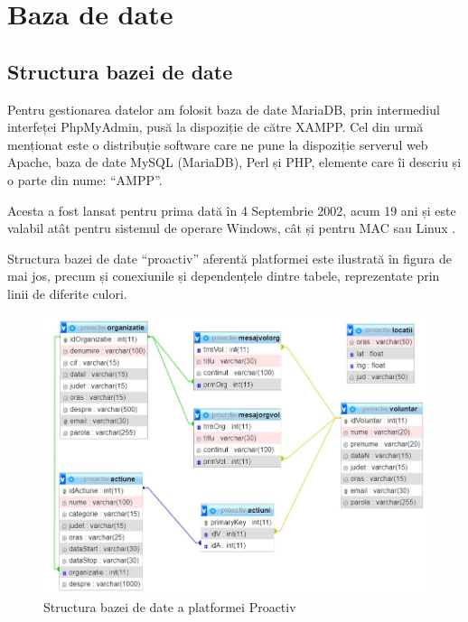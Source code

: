 \documentclass[12pt,a4paper]{report}
\begin{document}
\chapter{Baza de date}

\section{Structura bazei de date}
\par
Pentru gestionarea datelor am folosit baza de date MariaDB, prin intermediul interfeței PhpMyAdmin, pusă la dispoziție de către XAMPP. Cel din urmă menționat este o distribuție software care ne pune la dispoziție serverul web Apache, baza de date MySQL (MariaDB), Perl și PHP, elemente care îi descriu și o parte din nume: “AMPP”. 
\par
Acesta a fost lansat pentru prima dată în 4 Septembrie 2002, acum 19 ani și este valabil atât pentru sistemul de operare Windows, cât și pentru MAC sau Linux \cite{xampp}.
\\
\par
Structura bazei de date “proactiv” aferentă platformei este ilustrată în figura de mai jos, precum și conexiunile și dependențele dintre tabele, reprezentate prin linii de diferite culori.
\\
\begin{figure}[H]
\centering
  \includegraphics[width=0.8\linewidth]{./imagini/bazadate.jpg}
  \caption{Structura bazei de date a platformei Proactiv}
\end{figure}
\end{document}
